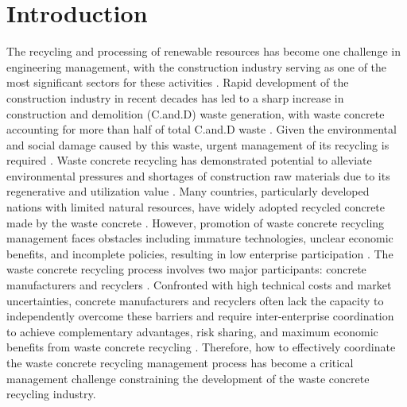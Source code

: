 \documentclass[authoryear,preprint,review,times,10pt]{elsarticle}
\begin{document}
\section{Introduction}
The recycling and processing of renewable resources has become one challenge in engineering management, with the construction industry serving as one of the most significant sectors for these activities \citep{yuan2025Exploring}. Rapid development of the construction industry in recent decades has led to a sharp increase in construction and demolition (C.and.D) waste generation, with waste concrete accounting for more than half of total C.and.D waste \citep{zhao2020Use}. Given the environmental and social damage caused by this waste, urgent management of its recycling is required \citep{wu2019Offsite}. Waste concrete recycling has demonstrated potential to alleviate environmental pressures and shortages of construction raw materials due to its regenerative and utilization value \citep{mostert2021Climate}. Many countries, particularly developed nations with limited natural resources, have widely adopted recycled concrete made by the waste concrete \citep{yenipazarli2019Incentives}. However, promotion of waste concrete recycling management faces obstacles including immature technologies, unclear economic benefits, and incomplete policies, resulting in low enterprise participation \citep{liu2021Explore,ma2020Challenges}. The waste concrete recycling process involves two major participants: concrete manufacturers and recyclers \citep{he2020Investigation,lu2015Stakeholders}. Confronted with high technical costs and market uncertainties, concrete manufacturers and recyclers often lack the capacity to independently overcome these barriers and require inter-enterprise coordination to achieve complementary advantages, risk sharing, and maximum economic benefits from waste concrete recycling \citep{bao2019Procurement}. Therefore, how to effectively coordinate the waste concrete recycling management process has become a critical management challenge constraining the development of the waste concrete recycling industry.
\end{document}
